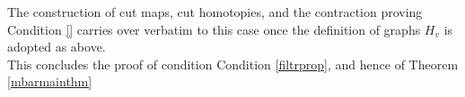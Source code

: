 \documentclass[a4paper,10pt]{amsart}
\begin{document}
The construction of cut maps, cut homotopies, and the contraction proving Condition \ref{} carries over verbatim to this case once the definition of graphs $H_v$ is adopted as above.\\
This concludes the proof of condition Condition \eqref{filtrprop}, and hence of Theorem \ref{mbarmainthm}
%		
\end{document}
